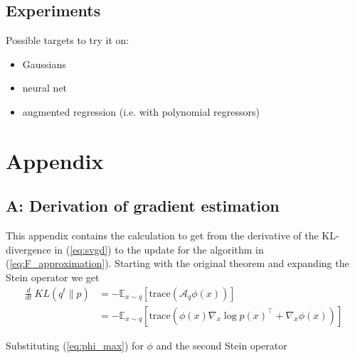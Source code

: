 \documentclass{article}
\begin{document}
\subsection{Experiments}
    Possible targets to try it on:
    \begin{itemize}
        \item Gaussians
        \item neural net
        \item augmented regression (i.e. with polynomial regressors)
    \end{itemize}


\section{Appendix}
\subsection{A: Derivation of gradient estimation}
    This appendix contains the calculation to get from the derivative of the KL-divergence in (\ref{eq:svgd})
    to the update for the algorithm in (\ref{eq:F_approximation}).
    Starting with the original theorem and expanding the Stein operator we get
    \begin{align}
        \frac{d}{dt}\ KL( q^t \| p ) &= - \mathbb{E}_{x \sim q} \left[ \text{trace} \left( \mathcal{A}_q \phi(x) \right) \right] \\
             &=  - \mathbb{E}_{x \sim q} \left[ 
                 \text{trace} \left( \phi(x) \nabla_x \log p(x)^\top  + \nabla_x \phi(x) \right)
             \right]\
    \end{align}

    Substituting (\ref{eq:phi_max}) for $\phi$ and the second Stein operator
\end{document}
